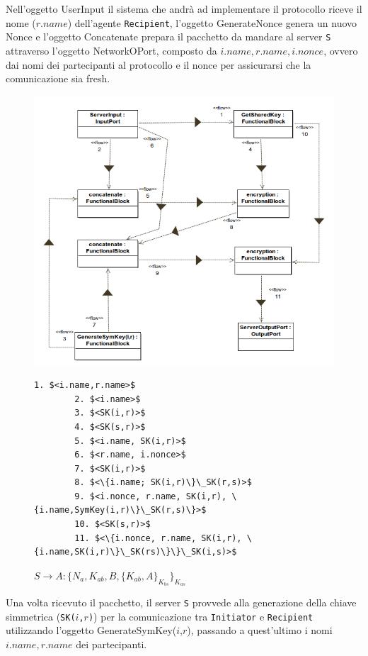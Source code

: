 \noindent Nell'oggetto UserInput il sistema che andrà ad implementare il protocollo riceve il nome ($r.name$) dell'agente \texttt{Recipient}, l'oggetto GenerateNonce genera un nuovo Nonce e l'oggetto Concatenate prepara il pacchetto da mandare al server \texttt{S} attraverso l'oggetto NetworkOPort, composto da $i.name, r.name, i.nonce$, ovvero dai nomi dei partecipanti al protocollo e il nonce per assicurarsi che la comunicazione sia fresh.
\newpage
\begin{figure}[h!] 
    \centering 
    \includegraphics[scale=0.5]{../img/NSSK/Second_Message(fromServer).png} 
    \begin{lstlisting}[frame=single, mathescape, basicstyle=\footnotesize]
        1. $<i.name,r.name>$
        2. $<i.name>$
        3. $<SK(i,r)>$
        4. $<SK(s,r)>$
        5. $<i.name, SK(i,r)>$
        6. $<r.name, i.nonce>$
        7. $<SK(i,r)>$
        8. $<\{i.name; SK(i,r)\}\_SK(r,s)>$
        9. $<i.nonce, r.name, SK(i,r), \{i.name,SymKey(i,r)\}\_SK(r,s)\}>$
        10. $<SK(s,r)>$
        11. $<\{i.nonce, r.name, SK(i,r), \{i.name,SK(i,r)\}\_SK(rs)\}\}\_SK(i,s)>$
    \end{lstlisting}
    \caption{$S \rightarrow A : \{N_a, K_{ab}, B, \{K_{ab}, A\}_{K_{bs}}\}_{K_{as}}$} 
\end{figure}
\noindent Una volta ricevuto il pacchetto, il server \texttt{S} provvede alla generazione della chiave simmetrica (\texttt{SK($i$,$r$)}) per la comunicazione tra \texttt{Initiator} e \texttt{Recipient} utilizzando l'oggetto GenerateSymKey($i$,$r$), passando a quest'ultimo i nomi $i.name, r.name$ dei partecipanti.\\ 
